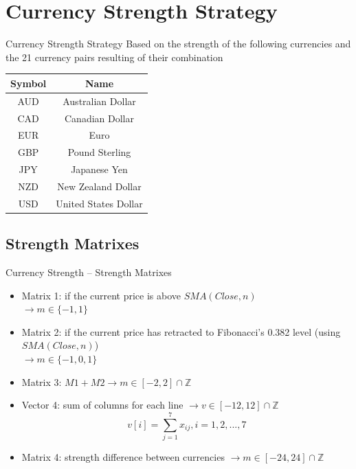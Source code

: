 \documentclass[12pt,portuguese]{beamer}
\begin{document}
\section{Currency Strength Strategy}
\begin{frame}{Currency Strength Strategy}
	Based on the strength of the following currencies and the 21 currency pairs resulting of their combination

\begin{table}[!htb]
	\centering
	\begin{tabular}{c|c}
		Symbol & Name \\ \hline\hline
		AUD & Australian Dollar \\
		CAD & Canadian Dollar \\
		EUR & Euro\\
		GBP & Pound Sterling \\
		JPY & Japanese Yen \\
		NZD & New Zealand Dollar \\
		USD & United States Dollar \\
	\end{tabular}
\end{table}

\end{frame}

\subsection{Strength Matrixes}
\begin{frame}{Currency Strength -- Strength Matrixes}
\begin{itemize}
	\item Matrix 1: if the current price is above $SMA(Close, n)$ \\ $\rightarrow m \in \{-1,1\}$
	\item Matrix 2: if the current price has retracted to Fibonacci's 0.382 level (using $SMA(Close, n)$)\\ $\rightarrow m \in \{-1,0,1\}$
	\item Matrix 3: $M1 + M2 \rightarrow m \in [-2,2] \cap \mathbb{Z}$
	\item Vector 4: sum of columns for each line $\rightarrow v \in [-12,12] \cap \mathbb{Z}$
		$$v[i] = \sum_{j=1}^7 x_{ij}, i=1,2, ..., 7$$
	\item Matrix 4: strength difference between currencies $\rightarrow m \in [-24,24] \cap \mathbb{Z}$
\end{itemize}
\end{frame}
\end{document}
